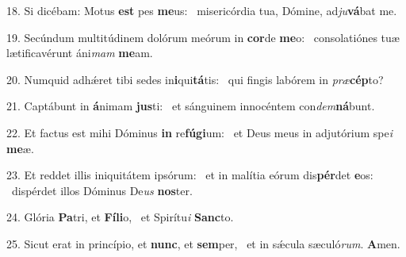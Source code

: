 18. Si dicébam: Motus \textbf{est} pes \textbf{me}us: \ast\  misericórdia tua, Dómine, ad\textit{ju}\textbf{vá}bat me.\

19. Secúndum multitúdinem dolórum meórum in \textbf{cor}de \textbf{me}o: \ast\  consolatiónes tuæ lætificavérunt áni\textit{mam} \textbf{me}am.\

20. Numquid adhǽret tibi sedes in\textbf{i}qui\textbf{tá}tis: \ast\  qui fingis labórem in \textit{præ}\textbf{cép}to?\

21. Captábunt in \textbf{á}nimam \textbf{jus}ti: \ast\  et sánguinem innocéntem con\textit{dem}\textbf{ná}bunt.\

22. Et factus est mihi Dóminus \textbf{in} re\textbf{fú}\textbf{gi}um: \ast\  et Deus meus in adjutórium spe\textit{i} \textbf{me}æ.\

23. Et reddet illis iniquitátem ipsórum: \dag\  et in malítia eórum dis\textbf{pér}det \textbf{e}os: \ast\  dispérdet illos Dóminus De\textit{us} \textbf{nos}ter.\

24. Glória \textbf{Pa}tri, et \textbf{Fí}\textbf{li}o, \ast\  et Spirítu\textit{i} \textbf{Sanc}to.\

25. Sicut erat in princípio, et \textbf{nunc}, et \textbf{sem}per, \ast\  et in sǽcula sæculó\textit{rum}. \textbf{A}men.\

